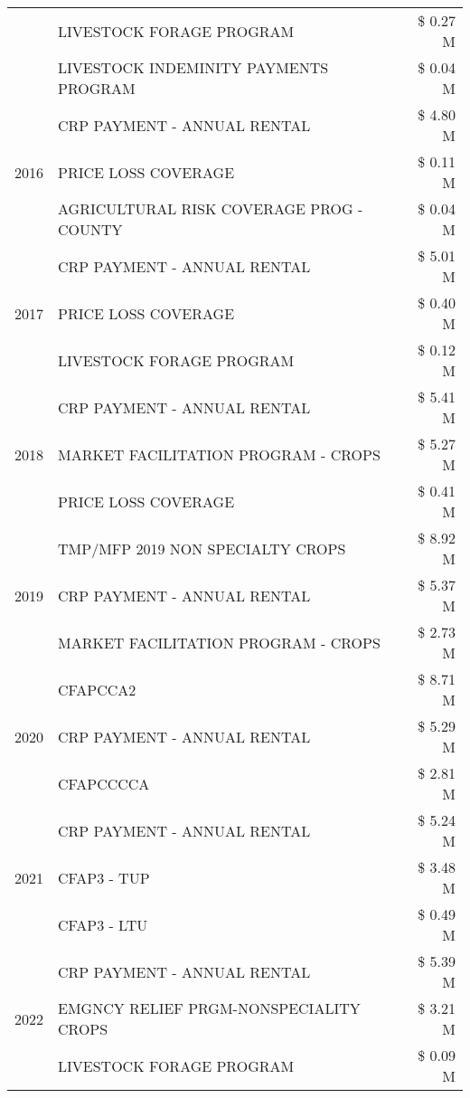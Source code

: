 \begin{tabular}{llr}
 & LIVESTOCK FORAGE PROGRAM & \$ 0.27 M \\
 & LIVESTOCK INDEMINITY PAYMENTS PROGRAM & \$ 0.04 M \\
\cline{1-3}
\multirow[t]{3}{*}{2016} & CRP PAYMENT - ANNUAL RENTAL & \$ 4.80 M \\
 & PRICE LOSS COVERAGE & \$ 0.11 M \\
 & AGRICULTURAL RISK COVERAGE PROG - COUNTY & \$ 0.04 M \\
\cline{1-3}
\multirow[t]{3}{*}{2017} & CRP PAYMENT - ANNUAL RENTAL & \$ 5.01 M \\
 & PRICE LOSS COVERAGE & \$ 0.40 M \\
 & LIVESTOCK FORAGE PROGRAM & \$ 0.12 M \\
\cline{1-3}
\multirow[t]{3}{*}{2018} & CRP PAYMENT - ANNUAL RENTAL & \$ 5.41 M \\
 & MARKET FACILITATION PROGRAM - CROPS & \$ 5.27 M \\
 & PRICE LOSS COVERAGE & \$ 0.41 M \\
\cline{1-3}
\multirow[t]{3}{*}{2019} & TMP/MFP 2019 NON SPECIALTY CROPS & \$ 8.92 M \\
 & CRP PAYMENT - ANNUAL RENTAL & \$ 5.37 M \\
 & MARKET FACILITATION PROGRAM - CROPS & \$ 2.73 M \\
\cline{1-3}
\multirow[t]{3}{*}{2020} & CFAPCCA2 & \$ 8.71 M \\
 & CRP PAYMENT - ANNUAL RENTAL & \$ 5.29 M \\
 & CFAPCCCCA & \$ 2.81 M \\
\cline{1-3}
\multirow[t]{3}{*}{2021} & CRP PAYMENT - ANNUAL RENTAL & \$ 5.24 M \\
 & CFAP3 - TUP & \$ 3.48 M \\
 & CFAP3 - LTU & \$ 0.49 M \\
\cline{1-3}
\multirow[t]{3}{*}{2022} & CRP PAYMENT - ANNUAL RENTAL & \$ 5.39 M \\
 & EMGNCY RELIEF PRGM-NONSPECIALITY CROPS & \$ 3.21 M \\
 & LIVESTOCK FORAGE PROGRAM & \$ 0.09 M \\
\cline{1-3}
\bottomrule
\end{tabular}
